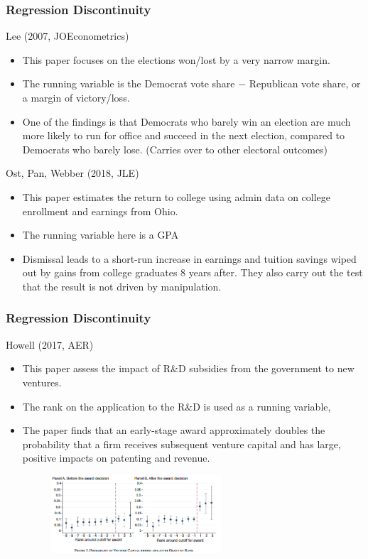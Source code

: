 \documentclass{beamer}
\begin{document}
\begin{frame}
\frametitle{Regression Discontinuity}
Lee (2007, JOEconometrics)
\begin{itemize}
\item  This paper focuses on the elections won/lost by a very narrow margin. 
\item The running variable is the Democrat vote share $-$ Republican vote share, or a margin of victory/loss.
\item One of the findings is that Democrats who barely win an election are much more likely to run for office and succeed in the next election, compared to Democrats who barely lose. (Carries over to other electoral outcomes)
\end{itemize}
Ost, Pan, Webber (2018, JLE)
\begin{itemize}
\item This paper estimates the return to college using admin data on college enrollment and earnings from Ohio.
\item The running variable here is a GPA
\item Dismissal leads to a short-run increase in earnings and tuition savings wiped out by gains from college graduates 8 years after. They also carry out the test that the result is not driven by manipulation.
\end{itemize}
\end{frame}

\begin{frame}
\frametitle{Regression Discontinuity}
Howell (2017, AER)
\begin{itemize}
\item This paper assess the impact of R\&D subsidies from the government to new ventures.
\item The rank on the application to the R\&D is used as a running variable, 
\item The paper finds that an early-stage award approximately doubles the probability that a firm receives subsequent venture capital  and has large, positive impacts on patenting and revenue. \medskip
\begin{figure}[H]
\centering
\includegraphics[width=0.6\textwidth, keepaspectratio]{RD_fig.png}
\end{figure}
\end{itemize}
\end{frame}
\end{document}

